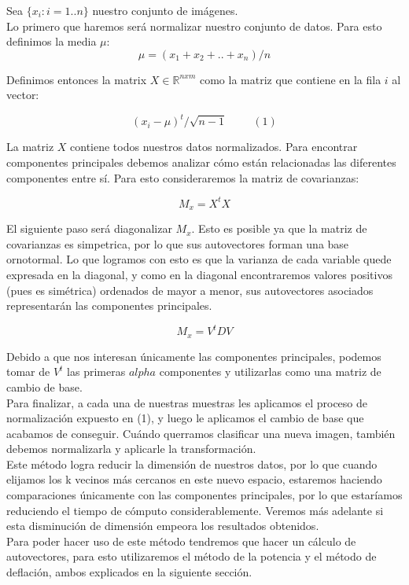 Sea $\{ x_i : i = 1 .. n\}$ nuestro conjunto de imágenes.  \\

Lo primero que haremos será normalizar nuestro conjunto de datos. Para esto definimos la media $\mu$:
$$ \mu = (x_1 + x_2 + .. + x_n) / n $$

Definimos entonces la matrix $X \in \mathbb{R}^{n x m}$ como la matriz que contiene en la fila $i$ al vector:

$$ (x_i - \mu)^{t} / \sqrt{n-1} \hspace{1cm}(1) $$

La matriz $X$ contiene todos nuestros datos normalizados. Para encontrar componentes principales debemos analizar cómo están relacionadas las diferentes componentes entre sí. Para esto consideraremos la matriz de covarianzas:

$$M_x = X^t X$$

El siguiente paso será diagonalizar $M_x$. Esto es posible ya que la matriz de covarianzas es simpetrica, por lo que sus autovectores forman una base ornotormal. Lo que logramos con esto es que la varianza de cada variable quede expresada en la diagonal, y como en la diagonal encontraremos valores positivos (pues es simétrica) ordenados de mayor a menor, sus autovectores asociados representarán las componentes principales.

$$ M_x = V^t D V$$

Debido a que nos interesan únicamente las componentes principales, podemos tomar de $V^t$ las primeras $alpha$ componentes y utilizarlas como una matriz de cambio de base. \\

Para finalizar, a cada una de nuestras muestras les aplicamos el proceso de normalización expuesto en (1), y luego le aplicamos el cambio de base que acabamos de conseguir. Cuándo querramos clasificar una nueva imagen, también debemos normalizarla y aplicarle la transformación. \\

Este método logra reducir la dimensión de nuestros datos, por lo que cuando elijamos los k vecinos más cercanos en este nuevo espacio, estaremos haciendo comparaciones únicamente con las componentes principales, por lo que estaríamos reduciendo el tiempo de cómputo considerablemente. Veremos más adelante si esta disminución de dimensión empeora los resultados obtenidos. \\

Para poder hacer uso de este método tendremos que hacer un cálculo de autovectores, para esto utilizaremos el método de la potencia y el método de deflación, ambos explicados en la siguiente sección. \\

